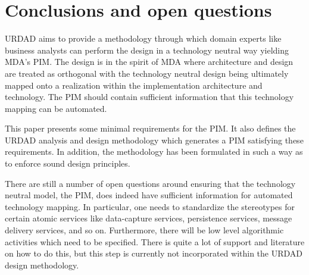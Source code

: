 \section{Conclusions and open questions}

URDAD aims to provide a methodology through which domain experts like business
analysts can perform the design in a technology neutral way yielding MDA's PIM.
The design is in the spirit of MDA where architecture and design are treated as
orthogonal with the technology neutral design being ultimately mapped onto a
realization within the implementation architecture and technology. The PIM
should contain sufficient information that this technology mapping can be
automated.

This paper presents some minimal requirements for the PIM. It also defines
the URDAD analysis and design methodology which generates a PIM satisfying
these requirements. In addition, the methodology has been formulated in such a
 way as to enforce sound design principles.

There are still a number of open questions around ensuring that the technology
neutral model, the PIM, does indeed have sufficient information for automated
technology mapping. In particular, one needs to standardize the stereotypes for
certain atomic services like data-capture services, persistence services,
message delivery services, and so on. Furthermore, there will be low level
algorithmic activities which need to be specified. There is quite a lot of
support and literature on how to do this, but this step is currently not
incorporated within the URDAD design methodology.
